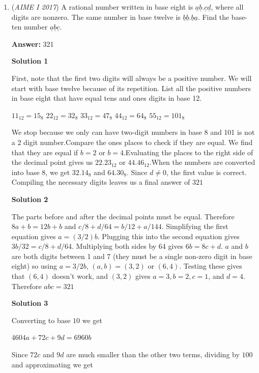 \begin{enumerate}
 


	\item (\textit{AIME I 2017}) A rational number written in base eight is $\underline{a} \underline{b} . \underline{c} \underline{d}$, where all digits are nonzero. The same number in base twelve is $\underline{b} \underline{b} . \underline{b} \underline{a}$. Find the base-ten number $\underline{a} \underline{b} \underline{c}$.


 
 \textbf{Answer: }321



\textbf{Solution 1}

First, note that the first two digits will always be a positive number. We will start with base twelve because of its repetition. List all the positive numbers in base eight that have equal tens and ones digits in base 12.

 $11_{12}=15_8$
$22_{12}=32_8$
$33_{12}=47_8$
$44_{12}=64_8$
$55_{12}=101_8$ 

 We stop because we only can have two-digit numbers in base 8 and 101 is not a 2 digit number.Compare the ones places to check if they are equal. We find that they are equal if $b=2$ or $b=4$.Evaluating the places to the right side of the decimal point gives us $22.23_{12}$ or $44.46_{12}$.When the numbers are converted into base 8, we get $32.14_8$ and $64.30_8$. Since $d\neq0$, the first value is correct. Compiling the necessary digits leaves us a final answer of $\boxed{321}$




\textbf{Solution 2}

The parts before and after the decimal points must be equal. Therefore $8a + b = 12b + b$ and $c/8 + d/64 = b/12 + a/144$.  Simplifying the first equation gives $a = (3/2)b$.  Plugging this into the second equation gives $3b/32 = c/8 + d/64$. Multiplying both sides by 64 gives $6b = 8c + d$.  $a$ and $b$ are both digits between 1 and 7 (they must be a single non-zero digit in base eight) so using $a = 3/2b$, $(a,b) = (3,2)$ or $(6,4)$.  Testing these gives that $(6,4)$ doesn't work, and $(3,2)$ gives $a = 3, b = 2, c = 1$, and $d = 4$.  Therefore $abc = \boxed{321}$




\textbf{Solution 3}

Converting to base $10$ we get 

 $4604a+72c+9d=6960b$

 Since $72c$ and $9d$ are much smaller than the other two terms, dividing by $100$ and approximating we get 


\end{enumerate}
